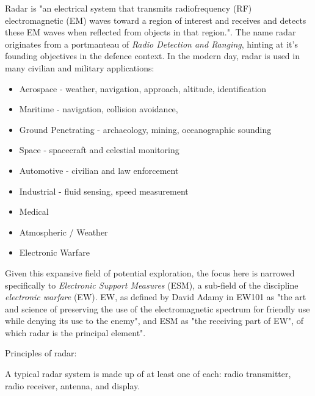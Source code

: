 Radar is "an electrical system that transmits radiofrequency (RF) electromagnetic (EM) waves toward a region of interest and receives and detects these EM waves when reflected
from objects in that region."\cite{richards_principles_2010}. The name radar originates from a portmanteau of \textit{Radio Detection and Ranging}\cite{the_joint_board_on_scientific_information_policy_radar_1945}, hinting at it's founding objectives in the defence context. In the modern day, radar is used in many civilian and military applications: \cite{merrill_i_skolnik_radar_nodate, desai_how_2022}
\begin{itemize}
    \item Aerospace - weather, navigation, approach, altitude, identification
    \item Maritime - navigation, collision avoidance,  
    \item Ground Penetrating - archaeology, mining, oceanographic sounding
    \item Space - spacecraft and celestial monitoring
    \item Automotive - civilian and law enforcement
    \item Industrial - fluid sensing, speed measurement
    \item Medical
    \item Atmospheric / Weather
    \item Electronic Warfare
\end{itemize}

Given this expansive field of potential exploration, the focus here is narrowed specifically to \textit{Electronic Support Measures} (ESM), a sub-field of the discipline \textit{electronic warfare} (EW). EW, as defined by David Adamy in EW101 as "the art and science of preserving the use of the electromagnetic spectrum for friendly use while denying its use to the enemy", and ESM as "the receiving part of EW"\cite{adamy_13_2001}, of which radar is the principal element".


Principles of radar:

A typical radar system is made up of at least one of each: radio transmitter, radio receiver, antenna, and display\cite{stimson_introduction_1998}. %



